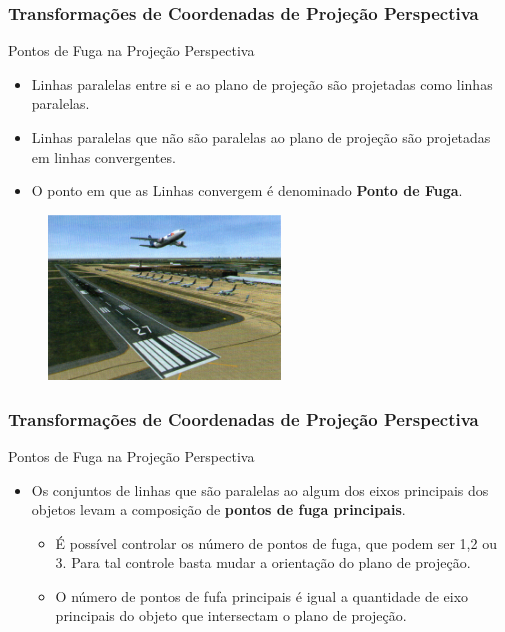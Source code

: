 \documentclass{beamer}
\begin{document}
\begin{frame}
\frametitle{Transformações de Coordenadas de Projeção Perspectiva}
	\begin{block}{Pontos de Fuga na Projeção Perspectiva}
		\begin{itemize}
			\item Linhas paralelas entre si e ao plano de projeção são projetadas como linhas paralelas.
			\item Linhas paralelas que não são paralelas ao plano de projeção são projetadas em linhas convergentes.
			\item O ponto em que as Linhas convergem é denominado \textbf{Ponto de Fuga}.
		\end{itemize}	
	\end{block}
	
	\begin{figure}[!h]
			\begin{center}
			\includegraphics[width=0.55\textwidth]{Figures/Pla}
			\end{center}
	\end{figure}
\end{frame}

\begin{frame}
\frametitle{Transformações de Coordenadas de Projeção Perspectiva}
	\begin{block}{Pontos de Fuga na Projeção Perspectiva}
		\begin{itemize}
			\item Os conjuntos de linhas que são paralelas ao algum dos eixos principais dos objetos levam a composição de \textbf{pontos de fuga principais}.
			\begin{itemize}
				\item É possível controlar os número de pontos de fuga, que podem ser 1,2 ou 3. Para tal controle basta mudar a orientação do plano de projeção.
				\item O número de pontos de fufa principais é igual a quantidade de eixo principais do objeto que intersectam o plano de projeção.
			\end{itemize}
		\end{itemize}	
	\end{block}
\end{frame}
\end{document}
